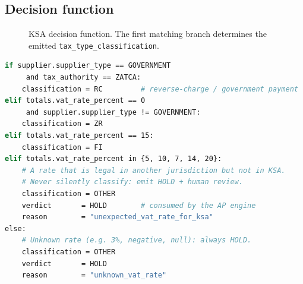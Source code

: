 \subsection{Decision function}

\begin{figure}[htbp]
\centering
{}
\caption{KSA decision function. The first matching branch determines
         the emitted \texttt{tax\_type\_classification}.}
\label{fig:ksa-decision}
\end{figure}

\begin{lstlisting}[language=bash,basicstyle=\ttfamily\small,caption={KSA
decision logic applied to a validated invoice record.}]
if supplier.supplier_type == GOVERNMENT
     and tax_authority == ZATCA:
    classification = RC         # reverse-charge / government payment
elif totals.vat_rate_percent == 0
     and supplier.supplier_type != GOVERNMENT:
    classification = ZR
elif totals.vat_rate_percent == 15:
    classification = FI
elif totals.vat_rate_percent in {5, 10, 7, 14, 20}:
    # A rate that is legal in another jurisdiction but not in KSA.
    # Never silently classify: emit HOLD + human review.
    classification = OTHER
    verdict       = HOLD        # consumed by the AP engine
    reason        = "unexpected_vat_rate_for_ksa"
else:
    # Unknown rate (e.g. 3%, negative, null): always HOLD.
    classification = OTHER
    verdict       = HOLD
    reason        = "unknown_vat_rate"
\end{lstlisting}

